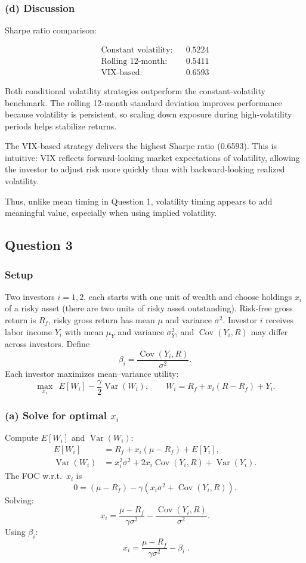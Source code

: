 \subsubsection*{(d) Discussion}
Sharpe ratio comparison:

\[
\begin{aligned}
\text{Constant volatility:} && 0.5224 \\
\text{Rolling 12-month:} && 0.5411 \\
\text{VIX-based:} && 0.6593
\end{aligned}
\]

Both conditional volatility strategies outperform the constant‐volatility benchmark. The rolling 12-month standard deviation improves performance because volatility is persistent, so scaling down exposure during high‐volatility periods helps stabilize returns.

The VIX-based strategy delivers the highest Sharpe ratio (0.6593). This is intuitive: VIX reflects forward-looking market expectations of volatility, allowing the investor to adjust risk more quickly than with backward-looking realized volatility.

Thus, unlike mean timing in Question 1, volatility timing appears to add meaningful value, especially when using implied volatility.

\pagebreak

\subsection*{Question 3}

\subsubsection*{Setup}
Two investors $i=1,2$, each starts with one unit of wealth and choose holdings $x_i$ of a risky asset (there are two units of risky asset outstanding). Risk-free gross return is $R_f$, risky gross return has mean $\mu$ and variance $\sigma^2$. Investor $i$ receives labor income $Y_i$ with mean $\mu_Y$ and variance $\sigma_Y^2$, and $\operatorname{Cov}(Y_i,R)$ may differ across investors. Define
$$
\beta_i = \frac{\operatorname{Cov}(Y_i,R)}{\sigma^2}.
$$
Each investor maximizes mean--variance utility:
$$
\max_{x_i}\ \ E[W_i] - \frac{\gamma}{2}\operatorname{Var}(W_i),
\qquad
W_i = R_f + x_i(R - R_f) + Y_i.
$$

\subsubsection*{(a) Solve for optimal $x_i$}
Compute $E[W_i]$ and $\operatorname{Var}(W_i)$:
\begin{align*}
E[W_i] &= R_f + x_i(\mu - R_f) + E[Y_i], \\
\operatorname{Var}(W_i) &= x_i^2 \sigma^2 + 2 x_i \operatorname{Cov}(Y_i,R) + \operatorname{Var}(Y_i).
\end{align*}
The FOC w.r.t.\ $x_i$ is
$$
0 = (\mu - R_f) - \gamma\left(x_i \sigma^2 + \operatorname{Cov}(Y_i,R)\right).
$$
Solving:
$$
x_i = \frac{\mu - R_f}{\gamma \sigma^2} - \frac{\operatorname{Cov}(Y_i,R)}{\sigma^2}.
$$
Using $\beta_i$:
$$
\boxed{ \; x_i = \frac{\mu - R_f}{\gamma\sigma^2} - \beta_i \; }.
$$

